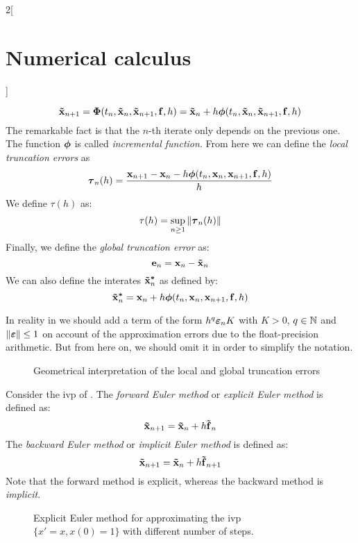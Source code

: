 \documentclass[../../../main_math.tex]{subfiles}
\begin{document}
\begin{multicols}{2}[\section{Numerical calculus}]
\begin{definition}
    \begin{equation}\label{NC:onestep}
      \boldsymbol{\mathrm{\tilde{x}}}_{n+1}=\boldsymbol{\mathrm{\Phi}}(t_n,\boldsymbol{\mathrm{\tilde{x}}}_{n},\boldsymbol{\mathrm{\tilde{x}}}_{n+1},\boldsymbol{\mathrm{f}},h)=\boldsymbol{\mathrm{\tilde{x}}}_{n}+h\boldsymbol{\mathrm{\phi}}(t_n,\boldsymbol{\mathrm{\tilde{x}}}_{n},\boldsymbol{\mathrm{\tilde{x}}}_{n+1},\boldsymbol{\mathrm{f}},h)
    \end{equation}
    The remarkable fact is that the $n$-th iterate only depends on the previous one.
    The function $\boldsymbol{\mathrm{\phi}}$ is called \emph{incremental function}. From here we can define the \emph{local truncation errors} as
    $$\boldsymbol{\mathrm{\tau}}_{n}(h)=\frac{\boldsymbol{\mathrm{x}}_{n+1}-\boldsymbol{\mathrm{x}}_{n}-h\boldsymbol{\mathrm{\phi}}(t_n,\boldsymbol{\mathrm{x}}_{n},\boldsymbol{\mathrm{x}}_{n+1},\boldsymbol{\mathrm{f}},h)}{h}$$
    We define $\tau(h)$ as: $$\tau(h)=\sup_{n\geq 1}\left\|\boldsymbol{\mathrm{\tau}}_n(h)\right\|$$
    Finally, we define the \emph{global truncation error} as:
    $$\boldsymbol{\mathrm{e}}_n=\boldsymbol{\mathrm{x}}_n-\boldsymbol{\mathrm{\tilde{x}}}_n$$
    We can also define the interates $\boldsymbol{\mathrm{\tilde{x}}}_n^{\boldsymbol{\mathrm{*}}}$ as defined by:
    $$\boldsymbol{\mathrm{\tilde{x}}}_n^{\boldsymbol{\mathrm{*}}}=\boldsymbol{\mathrm{x}}_{n}+h\boldsymbol{\mathrm{\phi}}(t_n,\boldsymbol{\mathrm{x}}_{n},\boldsymbol{\mathrm{x}}_{n+1},\boldsymbol{\mathrm{f}},h)$$
  \end{definition}
  \begin{remark}
    In reality in  we should add a term of the form $h^{q}\boldsymbol{\mathrm{\varepsilon}}_nK$ with $K>0$, $q\in\mathbb{N}$ and $\left\|\boldsymbol{\mathrm{\varepsilon}}\right\|\leq 1$ on account of the approximation errors due to the float-precision arithmetic. But from here on, we should omit it in order to simplify the notation.
  \end{remark}
  \begin{figure}[H]
    \centering
    
    \caption{Geometrical interpretation of the local and global truncation errors}
    \label{NC:errors_fig}
  \end{figure}
  \begin{definition}\label{NC:euler}
    Consider the ivp of . The \emph{forward Euler method} or \emph{explicit Euler method} is defined as:
    $$\boldsymbol{\mathrm{\tilde{x}}}_{n+1}=\boldsymbol{\mathrm{\tilde{x}}}_{n}+h\boldsymbol{\mathrm{\tilde{f}}}_n$$
    The \emph{backward Euler method} or \emph{implicit Euler method} is defined as:
    $$\boldsymbol{\mathrm{\tilde{x}}}_{n+1}=\boldsymbol{\mathrm{\tilde{x}}}_{n}+h\boldsymbol{\mathrm{\tilde{f}}}_{n+1}$$
    Note that the forward method is explicit, whereas the backward method is \emph{implicit}.
  \end{definition}
  \begin{figure}[H]
    \centering
    
    \caption{Explicit Euler method for approximating the ivp $\{x'=x, x(0)=1\}$ with different number of steps.}

\end{figure}
\end{multicols}
\end{document}
